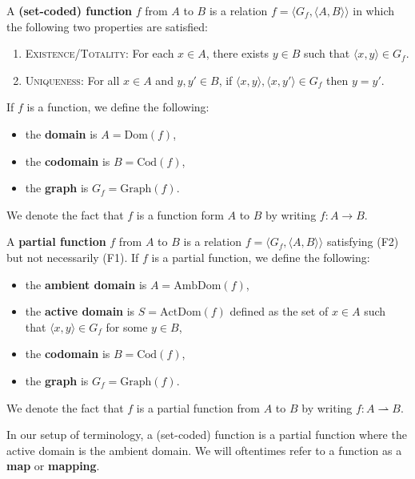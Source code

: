 \begin{definition}
	A \textbf{(set-coded) function} $f$ from $A$ to $B$ is a relation $f = \langle G_{f}, \langle A, B\rangle\rangle$ in which the following two properties are satisfied:
	\begin{enumerate}[itemsep=-0.4ex, label=(F\arabic*)]
		\item \textsc{Existence/Totality:}
		For each $x\in A$, there exists $y\in B$ such that $\langle x, y\rangle\in G_{f}$. 
		\item \textsc{Uniqueness:}
		For all $x\in A$ and $y, y'\in B$, if $\langle x, y\rangle, \langle x, y'\rangle\in G_{f}$ then $y = y'$.
	\end{enumerate}
	If $f$ is a function, we define the following:
	\begin{itemize}[itemsep=-0.4ex]
		\item the \textbf{domain} is $A = \textrm{Dom}(f)$,
		\item the \textbf{codomain} is $B = \textrm{Cod}(f)$,
		\item the \textbf{graph} is $G_{f} = \textrm{Graph}(f)$. 
	\end{itemize}
	We denote the fact that $f$ is a function form $A$ to $B$ by writing $f:A\rightarrow B$. 
\end{definition}

\begin{definition}
	A \textbf{partial function} $f$ from $A$ to $B$ is a relation $f = \langle G_{f}, \langle A, B\rangle\rangle$ satisfying (F2) but not necessarily (F1).
	If $f$ is a partial function, we define the following:
	\begin{itemize}[itemsep=-0.4ex]
		\item the \textbf{ambient domain} is $A = \textrm{AmbDom}(f)$,
		\item the \textbf{active domain} is $S = \textrm{ActDom}(f)$ defined as the set of $x\in A$ such that $\langle x, y\rangle\in G_{f}$ for some $y\in B$,
		\item the \textbf{codomain} is $B = \textrm{Cod}(f)$,
		\item the \textbf{graph} is $G_{f} = \textrm{Graph}(f)$.
	\end{itemize}
	We denote the fact that $f$ is a partial function from $A$ to $B$ by writing $f:A\rightharpoonup B$. 
\end{definition}

In our setup of terminology, a (set-coded) function is a partial function where the active domain is the ambient domain.
We will oftentimes refer to a function as a \textbf{map} or \textbf{mapping}. 

